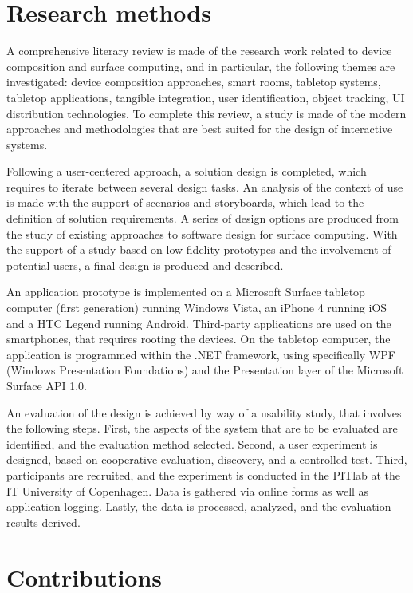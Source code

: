 \section{Research methods}

A comprehensive literary review is made of the research work related to device composition and surface computing, and in particular, the following themes are investigated: device composition approaches, smart rooms, tabletop systems, tabletop applications, tangible integration, user identification, object tracking, UI distribution technologies.
To complete this review, a study is made of the modern approaches and methodologies that are best suited for the design of interactive systems.

Following a user-centered approach, a solution design is completed, which requires to iterate between several design tasks.
An analysis of the context of use is made with the support of scenarios and storyboards, which lead to the definition of solution requirements.
A series of design options are produced from the study of existing approaches to software design for surface computing.
With the support of a study based on low-fidelity prototypes and the involvement of potential users, a final design is produced and described.

An application prototype is implemented on a Microsoft Surface tabletop computer (first generation) running Windows Vista, an iPhone 4 running iOS and a HTC Legend running Android.
Third-party applications are used on the smartphones, that requires rooting the devices.
On the tabletop computer, the application is programmed within the .NET framework,  using specifically WPF (Windows Presentation Foundations) and the Presentation layer of the Microsoft Surface API 1.0.

An evaluation of the design is achieved by way of a usability study, that involves the following steps.
First, the aspects of the system that are to be evaluated are identified, and the evaluation method selected.
Second, a user experiment is designed, based on cooperative evaluation, discovery, and a controlled test.
Third, participants are recruited, and the experiment is conducted in the PITlab at the IT University of Copenhagen.
Data is gathered via online forms as well as application logging.
Lastly, the data is processed, analyzed, and the evaluation results derived.

\section{Contributions}

